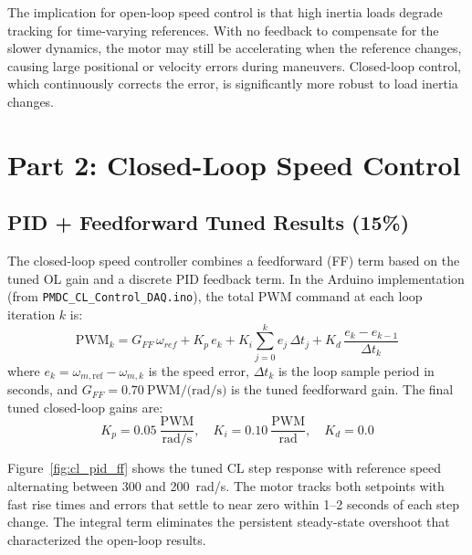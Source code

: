 \documentclass{article}
\begin{document}
The implication for open-loop speed control is that high inertia loads degrade tracking for time-varying references. With no feedback to compensate for the slower dynamics, the motor may still be accelerating when the reference changes, causing large positional or velocity errors during maneuvers. Closed-loop control, which continuously corrects the error, is significantly more robust to load inertia changes.

\section{Part 2: Closed-Loop Speed Control}

\subsection{PID + Feedforward Tuned Results (15\%)}

The closed-loop speed controller combines a feedforward (FF) term based on the tuned OL gain and a discrete PID feedback term. In the Arduino implementation (from \texttt{PMDC\_CL\_Control\_DAQ.ino}), the total PWM command at each loop iteration $k$ is:
\begin{equation}
    \mathrm{PWM}_k = G_{FF}\,\omega_{ref} + K_p\,e_k + K_i\!\sum_{j=0}^{k} e_j\,\Delta t_j + K_d\,\frac{e_k - e_{k-1}}{\Delta t_k}
    \label{eq:pid_ff}
\end{equation}
where $e_k = \omega_{m,\mathrm{ref}} - \omega_{m,k}$ is the speed error, $\Delta t_k$ is the loop sample period in seconds, and $G_{FF} = 0.70~\text{PWM/(rad/s)}$ is the tuned feedforward gain. The final tuned closed-loop gains are:
\begin{equation}
    \boxed{K_p = 0.05~\frac{\text{PWM}}{\text{rad/s}}, \quad
           K_i = 0.10~\frac{\text{PWM}}{\text{rad}}, \quad
           K_d = 0.0}
    \label{eq:cl_gains}
\end{equation}

Figure~\ref{fig:cl_pid_ff} shows the tuned CL step response with reference speed alternating between 300 and 200~rad/s. The motor tracks both setpoints with fast rise times and errors that settle to near zero within 1--2 seconds of each step change. The integral term eliminates the persistent steady-state overshoot that characterized the open-loop results.
\end{document}
